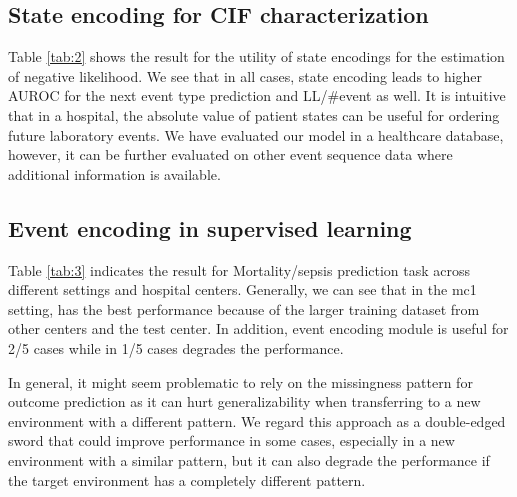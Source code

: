 \documentclass[journal,twoside,web]{ieeecolor}
\begin{document}
\subsection{State encoding for CIF characterization}


  
  


Table \ref*{tab:2} shows the result for the utility of state encodings for the estimation of negative likelihood. We see that in all cases, state encoding leads to higher AUROC for the next event type prediction and LL/\#event as well. It is intuitive that in a hospital, the absolute value of patient states can be useful for ordering future laboratory events. We have evaluated our model in a healthcare database, however, it can be further evaluated on other event sequence data where additional information is available.



\subsection{Event encoding in supervised learning}

Table \ref*{tab:3} indicates the result for Mortality/sepsis prediction task across different settings and hospital centers. Generally, we can see that in the mc1 setting, has the best performance because of the larger training dataset from other centers and the test center. In addition, event encoding module is useful for 2/5 cases while in 1/5 cases degrades the performance.

In general, it might seem problematic to rely on the missingness pattern for outcome prediction as it can hurt generalizability when transferring to a new environment with a different pattern. We regard this approach as a double-edged sword that could improve performance in some cases, especially in a new environment with a similar pattern, but it can also degrade the performance if the target environment has a completely different pattern.
\end{document}
